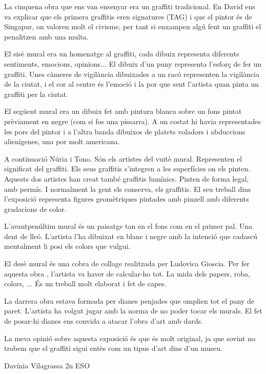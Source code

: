 \begin{news}
La cinquena obra que ens van ensenyar era un graffiti tradicional. En David ens va explicar que els primera graffitis eren signatures (TAG) i que el pintor és de Singapur, on valoren molt el civisme, per tant si enxampen algú fent un graffiti el penalitzen amb una multa.

El sisè mural era un homenatge al graffiti, cada dibuix representa diferents sentiments, emocions, opinions...
El dibuix d'un puny representa l'esforç de fer un graffiti. Unes càmeres de vigilància dibuixades a un racó representen la vigilància de la ciutat, i el cor al centre és l'emoció i la por que sent l'artista quan pinta un graffiti per la ciutat.

El següent mural era un dibuix fet amb pintura blanca sobre un fons pintat prèviament en negre (com si fos una pissarra). A un costat hi havia representades les pors del pintor i a l'altra banda dibuixos de platets voladors i abduccions alienígenes, una por molt americana.

A continuació Núria i Tono. Són els artistes del vuitè mural.
Representen el significat del graffiti.
Els seus graffitis s'integren a les superfícies on els pinten. Aquests dos artistes han creat també graffitis lumínics. Pinten de forma legal, amb permís. I normalment la gent els conserva, els graffitis. El seu treball dins l'exposició representa figures geomètriques pintades amb pinzell amb diferents gradacions de color.

L'avantpenúltim mural és un paisatge tan en el fons com en el primer pal. Una dent de lleó. L'artista l'ha dibuixat en blanc i negre amb la intenció  que cadascú mentalment li posi els colors que vulgui.

El desè mural és una cobra de collage realitzada per Ludovica Gioscia. Per fer aquesta obra , l'artista va haver de calcular-ho tot. La mida dels papers, roba, colors, ...
És un treball molt elaborat i fet de capes.

La darrera obra estava formada per dianes penjades que omplien tot el pany de paret.
L'artista ha volgut jugar amb la norma de no poder tocar els murals. El fet de posar-hi dianes ens convida a atacar l'obra d'art amb dards.

La meva opinió sobre aquesta exposició és que és molt original, ja que sovint no trobem que el graffiti sigui entès com un tipus d'art dins d'un museu.

							Davínia Vilagrassa 2n ESO


\end{news}

